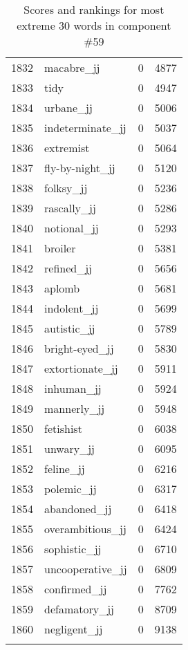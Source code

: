 \begin{longtable}[!htbp]{| rlr@{.}l |}
    1832 & macabre\_jj & 0 & 4877 \\
    1833 & tidy & 0 & 4947 \\
    1834 & urbane\_jj & 0 & 5006 \\
    1835 & indeterminate\_jj & 0 & 5037 \\
    1836 & extremist & 0 & 5064 \\
    1837 & fly-by-night\_jj & 0 & 5120 \\
    1838 & folksy\_jj & 0 & 5236 \\
    1839 & rascally\_jj & 0 & 5286 \\
    1840 & notional\_jj & 0 & 5293 \\
    1841 & broiler & 0 & 5381 \\
    1842 & refined\_jj & 0 & 5656 \\
    1843 & aplomb & 0 & 5681 \\
    1844 & indolent\_jj & 0 & 5699 \\
    1845 & autistic\_jj & 0 & 5789 \\
    1846 & bright-eyed\_jj & 0 & 5830 \\
    1847 & extortionate\_jj & 0 & 5911 \\
    1848 & inhuman\_jj & 0 & 5924 \\
    1849 & mannerly\_jj & 0 & 5948 \\
    1850 & fetishist & 0 & 6038 \\
    1851 & unwary\_jj & 0 & 6095 \\
    1852 & feline\_jj & 0 & 6216 \\
    1853 & polemic\_jj & 0 & 6317 \\
    1854 & abandoned\_jj & 0 & 6418 \\
    1855 & overambitious\_jj & 0 & 6424 \\
    1856 & sophistic\_jj & 0 & 6710 \\
    1857 & uncooperative\_jj & 0 & 6809 \\
    1858 & confirmed\_jj & 0 & 7762 \\
    1859 & defamatory\_jj & 0 & 8709 \\
    1860 & negligent\_jj & 0 & 9138 \\
    \hline
    \caption{Scores and rankings for most extreme 30 words in component \#59} \\
\end{longtable}
